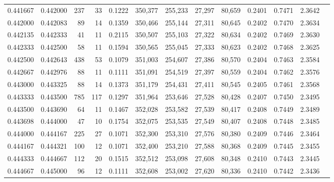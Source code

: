 \begin{tabular}{rrrrrrrrrrrrr}
0.441667 & 0.442000 &   237 &  33 &                                     0.1222 & 350,377 & 255,233 &  27,297 &  80,659 & 0.2401 & 0.7471 & 2.3642 \\
0.442000 & 0.442083 &    89 &  14 &                                     0.1359 & 350,466 & 255,144 &  27,311 &  80,645 & 0.2402 & 0.7470 & 2.3634 \\
0.442135 & 0.442333 &    41 &  11 &                                     0.2115 & 350,507 & 255,103 &  27,322 &  80,634 & 0.2402 & 0.7469 & 2.3630 \\
0.442333 & 0.442500 &    58 &  11 &                                     0.1594 & 350,565 & 255,045 &  27,333 &  80,623 & 0.2402 & 0.7468 & 2.3625 \\
0.442500 & 0.442643 &   438 &  53 &                                     0.1079 & 351,003 & 254,607 &  27,386 &  80,570 & 0.2404 & 0.7463 & 2.3584 \\
0.442667 & 0.442976 &    88 &  11 &                                     0.1111 & 351,091 & 254,519 &  27,397 &  80,559 & 0.2404 & 0.7462 & 2.3576 \\
0.443000 & 0.443325 &    88 &  14 &                                     0.1373 & 351,179 & 254,431 &  27,411 &  80,545 & 0.2405 & 0.7461 & 2.3568 \\
0.443333 & 0.443500 &   785 & 117 &                                     0.1297 & 351,964 & 253,646 &  27,528 &  80,428 & 0.2407 & 0.7450 & 2.3495 \\
0.443500 & 0.443690 &    64 &  11 &                                     0.1467 & 352,028 & 253,582 &  27,539 &  80,417 & 0.2408 & 0.7449 & 2.3489 \\
0.443698 & 0.444000 &    47 &  10 &                                     0.1754 & 352,075 & 253,535 &  27,549 &  80,407 & 0.2408 & 0.7448 & 2.3485 \\
0.444000 & 0.444167 &   225 &  27 &                                     0.1071 & 352,300 & 253,310 &  27,576 &  80,380 & 0.2409 & 0.7446 & 2.3464 \\
0.444167 & 0.444321 &   100 &  12 &                                     0.1071 & 352,400 & 253,210 &  27,588 &  80,368 & 0.2409 & 0.7445 & 2.3455 \\
0.444333 & 0.444667 &   112 &  20 &                                     0.1515 & 352,512 & 253,098 &  27,608 &  80,348 & 0.2410 & 0.7443 & 2.3445 \\
0.444667 & 0.445000 &    96 &  12 &                                     0.1111 & 352,608 & 253,002 &  27,620 &  80,336 & 0.2410 & 0.7442 & 2.3436 \\

\end{tabular}
